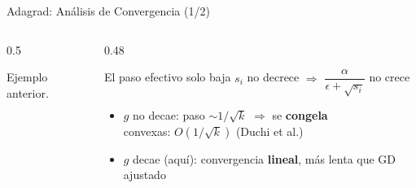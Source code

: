 \begin{frame}{Adagrad: Análisis de Convergencia (1/2)}
\begin{columns}[T]
\begin{column}{0.5\textwidth}
            {\tiny Ejemplo anterior.\par}
        \end{column}
        \begin{column}{0.48\textwidth}
            \begin{alertblock}{El paso efectivo solo baja}
                \footnotesize
                $s_i$ no decrece $\Rightarrow$ $\dfrac{\alpha}{\epsilon+\sqrt{s_i}}$ no crece
            \end{alertblock}
            \small
            \begin{itemize}
                \item $g$ no decae: paso $\sim 1/\sqrt{k}$ $\Rightarrow$ se \textbf{congela}\\
                      {\scriptsize convexas: $O(1/\sqrt{k})$ (Duchi et al.)}
                \item $g$ decae (aquí): convergencia \textbf{lineal}, más lenta que GD ajustado
            \end{itemize}
        \end{column}
    \end{columns}
\end{frame}

